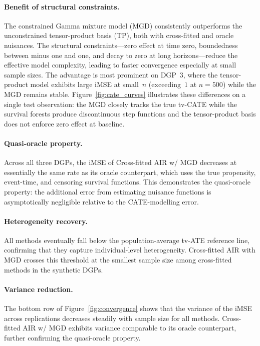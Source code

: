 \documentclass{article}
\begin{document}
\paragraph{Benefit of structural constraints.}
The constrained Gamma mixture model (MGD) consistently outperforms the unconstrained tensor-product basis (TP), both with cross-fitted and oracle nuisances.
The structural constraints---zero effect at time zero, boundedness between minus one and one, and decay to zero at long horizons---reduce the effective model complexity, leading to faster convergence especially at small sample sizes.
The advantage is most prominent on DGP~3, where the tensor-product model exhibits large iMSE at small~$n$ (exceeding~$1$ at $n = 500$) while the MGD remains stable.
Figure~\ref{fig:cate_curves} illustrates these differences on a single test observation: the MGD closely tracks the true tv-CATE while the survival forests produce discontinuous step functions and the tensor-product basis does not enforce zero effect at baseline.

\paragraph{Quasi-oracle property.}
Across all three DGPs, the iMSE of Cross-fitted AIR w/ MGD decreases at essentially the same rate as its oracle counterpart, which uses the true propensity, event-time, and censoring survival functions.
This demonstrates the quasi-oracle property: the additional error from estimating nuisance functions is asymptotically negligible relative to the CATE-modelling error.

\paragraph{Heterogeneity recovery.}
All methods eventually fall below the population-average tv-ATE reference line, confirming that they capture individual-level heterogeneity.
Cross-fitted AIR with MGD crosses this threshold at the smallest sample size among cross-fitted methods in the synthetic DGPs.

\paragraph{Variance reduction.}
The bottom row of Figure~\ref{fig:convergence} shows that the variance of the iMSE across replications decreases steadily with sample size for all methods.  Cross-fitted AIR w/ MGD exhibits variance comparable to its oracle counterpart, further confirming the quasi-oracle property.
\end{document}
